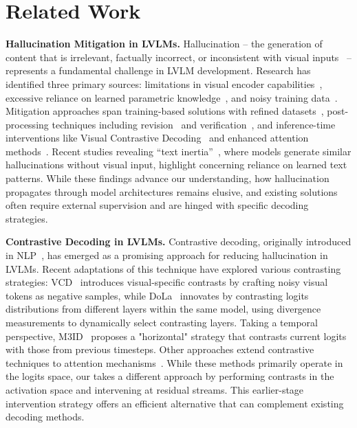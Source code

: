 \section{Related Work}
\label{sec:related_work}

\textbf{Hallucination Mitigation in LVLMs.} 
Hallucination -- the generation of content that is irrelevant, factually incorrect, or inconsistent with visual inputs~\cite{bai2024hallucination} -- represents a fundamental challenge in LVLM development. Research has identified three primary sources: limitations in visual encoder capabilities~\cite{tong2024eyes, liu2024llavanext, shi2024eagle}, excessive reliance on learned parametric knowledge~\cite{li-etal-2023-evaluating, zhou2023analyzing, vcd, opera}, and noisy training data~\cite{liu2023mitigating, yu2024hallucidoctor}. Mitigation approaches span training-based solutions with refined datasets~\cite{yue2024less, jiang2024hallucination}, post-processing techniques including revision~\cite{yin2023woodpecker, zhou2023analyzing} and verification~\cite{chen2024halc, sun2023aligning}, and inference-time interventions like Visual Contrastive Decoding~\cite{vcd} and enhanced attention methods~\cite{pai}. Recent studies revealing ``text inertia''~\cite{pai}, where models generate similar hallucinations without visual input, highlight concerning reliance on learned text patterns. While these findings advance our understanding, how hallucination propagates through model architectures remains elusive, and existing solutions often require external supervision and are hinged with specific decoding strategies.

\textbf{Contrastive Decoding in LVLMs.} 
Contrastive decoding, originally introduced in NLP~\cite{li2022contrastive, shi2023trusting}, has emerged as a promising approach for reducing hallucination in LVLMs. Recent adaptations of this technique have explored various contrasting strategies: VCD~\cite{vcd} introduces visual-specific contrasts by crafting noisy visual tokens as negative samples, while DoLa~\cite{dola} innovates by contrasting logits distributions from different layers within the same model, using divergence measurements to dynamically select contrasting layers. Taking a temporal perspective, M3ID~\cite{favero2024multi} proposes a "horizontal" strategy that contrasts current logits with those from previous timesteps. Other approaches extend contrastive techniques to attention mechanisms~\cite{woo2024don}. While these methods primarily operate in the logits space, our \ours takes a different approach by performing contrasts in the activation space and intervening at residual streams. This earlier-stage intervention strategy offers an efficient alternative that can complement existing decoding methods.